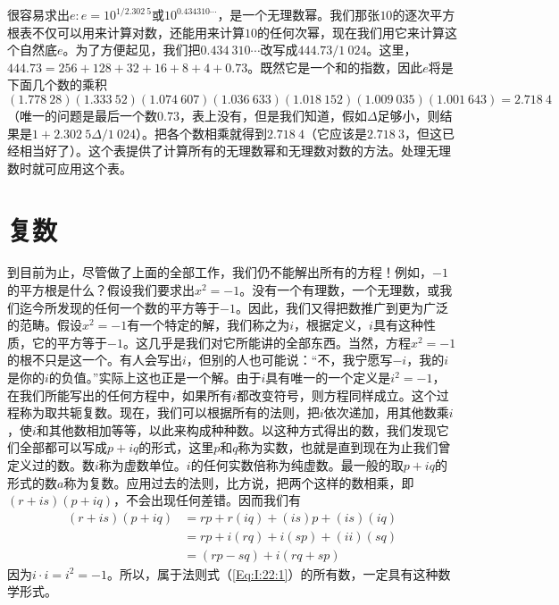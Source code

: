 很容易求出$e:e=10^{1/2.302~5}$或$10^{0.434 310\cdots}$，是一个无理数幂。我们那张$10$的逐次平方根表不仅可以用来计算对数，还能用来计算$10$的任何次幂，现在我们用它来计算这个自然底$e$。为了方便起见，我们把$0.434~310\cdots$改写成$444.73/1~024$。这里，$444.73=256+128+32+16+8+4+0.73$。既然它是一个和的指数，因此$e$将是下面几个数的乘积
\begin{equation*}
    (1.778~28)(1.333~52)(1.074~607)(1.036~633)(1.018~152)(1.009~035)(1.001~643)=2.718~4
\end{equation*}
（唯一的问题是最后一个数$0.73$，表上没有，但是我们知道，假如$\Delta$足够小，则结果是$1+2.302~5\Delta/1~024$）。把各个数相乘就得到$2.718~4$（它应该是$2.718~3$，但这已经相当好了）。这个表提供了计算所有的无理数幂和无理数对数的方法。处理无理数时就可应用这个表。

\section{复数}

到目前为止，尽管做了上面的全部工作，我们仍不能解出所有的方程！例如，$-1$的平方根是什么？假设我们要求出$x^2=-1$。没有一个有理数，一个无理数，或我们迄今所发现的任何一个数的平方等于$-1$。因此，我们又得把数推广到更为广泛的范畴。假设$x^2=-1$有一个特定的解，我们称之为$i$，根据定义，$i$具有这种性质，它的平方等于$-1$。这几乎是我们对它所能讲的全部东西。当然，方程$x^2=-1$的根不只是这一个。有人会写出$i$，但别的人也可能说：“不，我宁愿写$-i$，我的$i$是你的$i$的负值。”实际上这也正是一个解。由于$i$具有唯一的一个定义是$i^2=-1$，在我们所能写出的任何方程中，如果所有$i$都改变符号，则方程同样成立。这个过程称为取共轭复数。现在，我们可以根据所有的法则，把$i$依次递加，用其他数乘$i$，使$i$和其他数相加等等，以此来构成种种数。以这种方式得出的数，我们发现它们全部都可以写成$p+iq$的形式，这里$p$和$q$称为实数，也就是直到现在为止我们曾定义过的数。数$i$称为虚数单位。$i$的任何实数倍称为纯虚数。最一般的取$p+iq$的形式的数$a$称为复数。应用过去的法则，比方说，把两个这样的数相乘，即$(r+is)(p+iq)$，不会出现任何差错。因而我们有
\begin{equation}
    \label{Eq:I:22:4}
    \begin{aligned}
        (r+is)(p+iq)&=rp+r(iq)+(is)p+(is)(iq) \\
        &=rp+i(rq)+i(sp)+(ii)(sq) \\
        &=(rp-sq)+i(rq+sp)
    \end{aligned}
\end{equation}
因为$i\cdot i=i^2=-1$。所以，属于法则式（\ref{Eq:I:22:1}）的所有数，一定具有这种数学形式。

